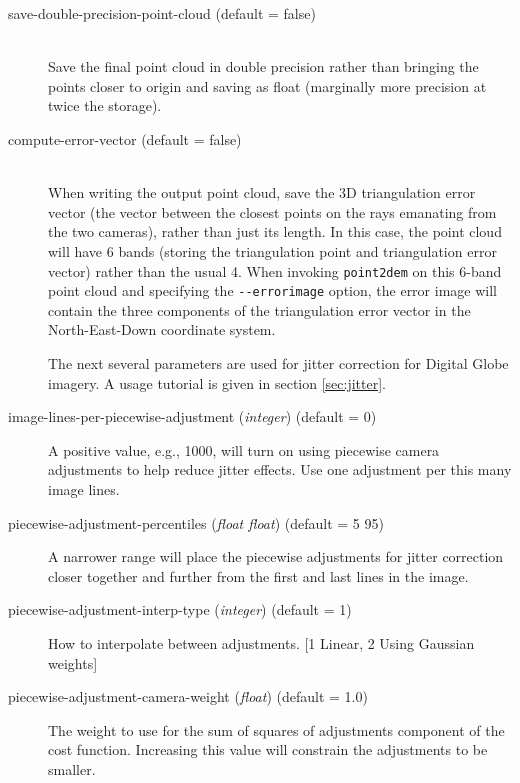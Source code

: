 \begin{description}
\item[save-double-precision-point-cloud \textnormal (default = false)] \hfill \\

Save the final point cloud in double precision rather than bringing the
points closer to origin and saving as float (marginally more precision
at twice the storage).

\item[compute-error-vector \textnormal (default = false)] \hfill \\

When writing the output point cloud, save the 3D triangulation error
vector (the vector between the closest points on the rays emanating from
the two cameras), rather than just its length. In this case, the point
cloud will have 6 bands (storing the triangulation point and
triangulation error vector) rather than the usual 4. When invoking
\texttt{point2dem} on this 6-band point cloud and specifying the
\texttt{-\/-errorimage} option, the error image will contain the three
components of the triangulation error vector in the North-East-Down
coordinate system.

The next several parameters are used for jitter correction for Digital
Globe imagery. A usage tutorial is given in section \ref{sec:jitter}.

\item[image-lines-per-piecewise-adjustment \textnormal{\small{(\emph{integer})}} (default = 0)]
A positive value, e.g., 1000, will turn on using piecewise camera adjustments to help reduce jitter effects. Use one adjustment per this many image lines.

\item[piecewise-adjustment-percentiles \textnormal{\small{(\emph{float
        float})}} (default = 5 95)]
A narrower range will place the piecewise adjustments for jitter correction closer together and further from the first and last lines in the image.

\item[piecewise-adjustment-interp-type \textnormal{\small{(\emph{integer})}} (default = 1)]
How to interpolate between adjustments. [1 Linear, 2 Using Gaussian weights]

\item[piecewise-adjustment-camera-weight \textnormal{\small{(\emph{float})}} (default = 1.0)]
The weight to use for the sum of squares of adjustments component of the cost function. Increasing this value will constrain the adjustments to be smaller.


\end{description}
